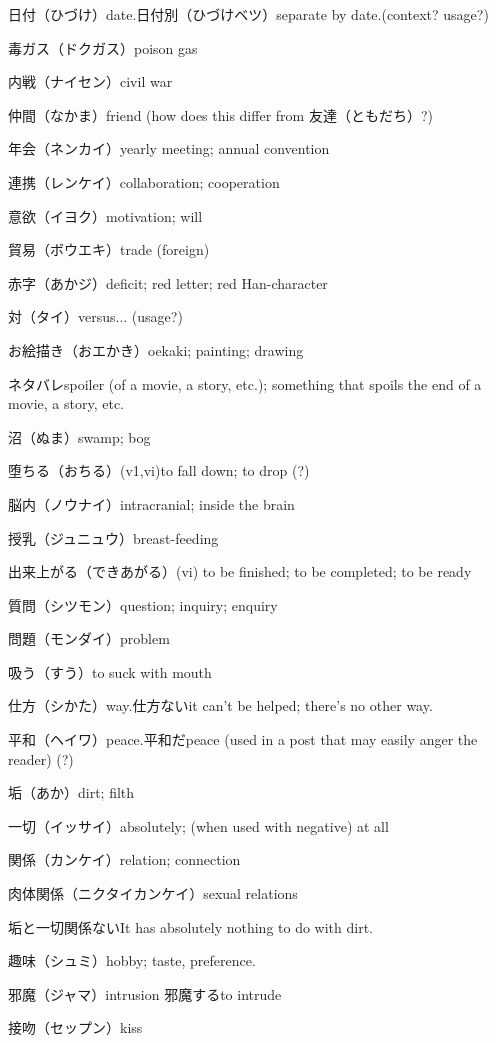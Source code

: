 日付（ひづけ）date.日付別（ひづけベツ）separate by date.(context? usage?)

毒ガス（ドクガス）poison gas

内戦（ナイセン）civil war

仲間（なかま）friend (how does this differ from 友達（ともだち）?)

年会（ネンカイ）yearly meeting; annual convention

連携（レンケイ）collaboration; cooperation

意欲（イヨク）motivation; will

貿易（ボウエキ）trade (foreign)

赤字（あかジ）deficit; red letter; red Han-character

対（タイ）versus... (usage?)

お絵描き（おエかき）oekaki; painting; drawing

ネタバレspoiler (of a movie, a story, etc.); something that spoils the end of a movie, a story, etc.

沼（ぬま）swamp; bog

堕ちる（おちる）(v1,vi)to fall down; to drop (?)

脳内（ノウナイ）intracranial; inside the brain

授乳（ジュニュウ）breast-feeding

出来上がる（できあがる）(vi) to be finished; to be completed; to be ready

質問（シツモン）question; inquiry; enquiry

問題（モンダイ）problem

吸う（すう）to suck with mouth

仕方（シかた）way.仕方ないit can't be helped; there's no other way.

平和（ヘイワ）peace.平和だpeace (used in a post that may easily anger the reader) (?)

垢（あか）dirt; filth

一切（イッサイ）absolutely; (when used with negative) at all

関係（カンケイ）relation; connection

肉体関係（ニクタイカンケイ）sexual relations

垢と一切関係ないIt has absolutely nothing to do with dirt.

趣味（シュミ）hobby; taste, preference.

邪魔（ジャマ）intrusion
邪魔するto intrude

接吻（セップン）kiss

